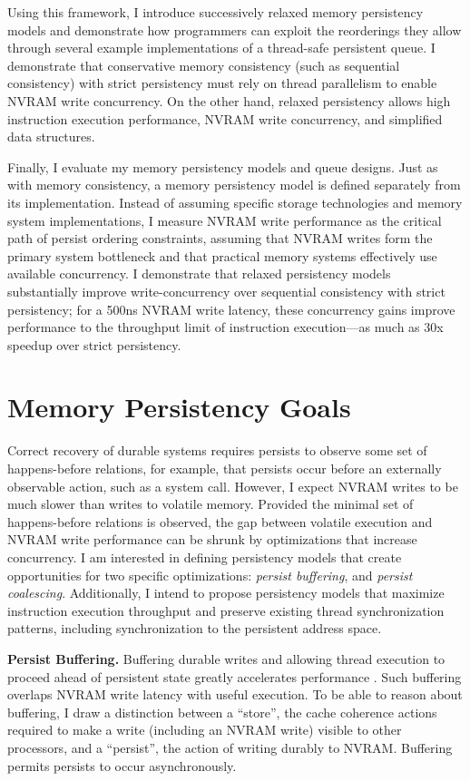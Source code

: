 Using this framework, I introduce successively relaxed memory persistency models and demonstrate how programmers can exploit the reorderings they allow through several example implementations of a thread-safe persistent queue.
I demonstrate that conservative memory consistency (such as sequential consistency) with strict persistency must rely on thread parallelism to enable NVRAM write concurrency.
On the other hand, relaxed persistency allows high instruction execution performance, NVRAM write concurrency, and simplified data structures.

Finally, I evaluate my memory persistency models and queue designs.
Just as with memory consistency, a memory persistency model is defined separately from its implementation.
Instead of assuming specific storage technologies and memory system implementations, I measure NVRAM write performance as the critical path of persist ordering constraints, assuming that NVRAM writes form the primary system bottleneck and that practical memory systems effectively use available concurrency.
I demonstrate that relaxed persistency models substantially improve write-concurrency over sequential consistency with strict persistency; for a 500ns NVRAM write latency, these concurrency gains improve performance to the throughput limit of instruction execution---as much as 30x speedup over strict persistency.

\section{Memory Persistency Goals}
\label{sec:Persistency:Goals}

Correct recovery of durable systems requires persists to observe some set of happens-before relations, for example, that persists occur before an externally observable action, such as a system call.  
However, I expect NVRAM writes to be much slower than writes to volatile memory.
Provided the minimal set of happens-before relations is observed, the gap between volatile execution and NVRAM write performance can be shrunk by optimizations that increase concurrency. 
I am interested in defining persistency models that create opportunities for two specific optimizations: \emph{persist buffering}, and \emph{persist coalescing}.
Additionally, I intend to propose persistency models that maximize instruction execution throughput and preserve existing thread synchronization patterns, including synchronization to the persistent address space.

\textbf{Persist Buffering.}
Buffering durable writes and allowing thread execution to proceed ahead of persistent state greatly accelerates performance \cite{ConditNightingale09}.
Such buffering overlaps NVRAM write latency with useful execution. 
To be able to reason about buffering, I draw a distinction between a ``store'', the cache coherence actions required to make a write (including an NVRAM write) visible to other processors, and a ``persist'', the action of writing durably to NVRAM.
Buffering permits persists to occur asynchronously.  

